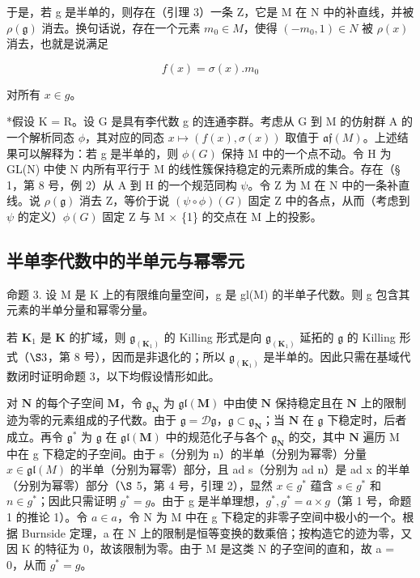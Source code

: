 于是，若 g 是半单的，则存在（引理 3）一条 Z，它是 M 在 N 中的补直线，并被 \(\rho(\mathfrak{g})\) 消去。换句话说，存在一个元素 \(m_{0} \in M\)，使得 \((-m_{0}, 1) \in N\) 被 \(\rho(x)\) 消去，也就是说满足

\[
f (x) = \sigma (x). m _ {0}\tag{2}
\]

对所有 \(x \in g\)。

*假设 K = R。设 G 是具有李代数 g 的连通李群。考虑从 G 到 M 的仿射群 A 的一个解析同态 \(\phi\)，其对应的同态 \(x \mapsto (f(x), \sigma(x))\) 取值于 \(\mathfrak{af}(M)\)。上述结果可以解释为：若 g 是半单的，则 \(\phi(G)\) 保持 M 中的一个点不动。令 H 为 GL(N) 中使 N 内所有平行于 M 的线性簇保持稳定的元素所成的集合。存在（§ 1，第 8 号，例 2）从 A 到 H 的一个规范同构 \(\psi\)。令 Z 为 M 在 N 中的一条补直线。说 \(\rho(\mathfrak{g})\) 消去 Z，等价于说 \((\psi \circ \phi)(G)\) 固定 Z 中的各点，从而（考虑到 \(\psi\) 的定义）\(\phi(G)\) 固定 Z 与 M × \{1\} 的交点在 M 上的投影。

\subsection{半单李代数中的半单元与幂零元}

命题 3. 设 M 是 K 上的有限维向量空间，g 是 gl(M) 的半单子代数。则 g 包含其元素的半单分量和幂零分量。

若 \(\mathbf{K}_1\) 是 \(\mathbf{K}\) 的扩域，则 \(\mathfrak{g}_{(\mathbf{K}_1)}\) 的 Killing 形式是向 \(\mathfrak{g}_{(\mathbf{K}_1)}\) 延拓的 \(\mathfrak{g}\) 的 Killing 形式（\(\S 3\)，第 8 号），因而是非退化的；所以 \(\mathfrak{g}_{(\mathbf{K}_1)}\) 是半单的。因此只需在基域代数闭时证明命题 3，以下均假设情形如此。

对 \(\mathbf{N}\) 的每个子空间 \(\mathbf{M}\)，令 \(\mathfrak{g}_{\mathbf{N}}\) 为 \(\mathfrak{gl}(\mathbf{M})\) 中由使 \(\mathbf{N}\) 保持稳定且在 \(\mathbf{N}\) 上的限制迹为零的元素组成的子代数。由于 \(\mathfrak{g} = \mathcal{D}\mathfrak{g}\)，\(\mathfrak{g} \subset \mathfrak{g}_{\mathbf{N}}\)；当 \(\mathbf{N}\) 在 \(\mathfrak{g}\) 下稳定时，后者成立。再令 \(\mathfrak{g}^*\) 为 \(\mathfrak{g}\) 在 \(\mathfrak{gl}(\mathbf{M})\) 中的规范化子与各个 \(\mathfrak{g}_{\mathbf{N}}\) 的交，其中 \(\mathbf{N}\) 遍历 M 中在 g 下稳定的子空间。由于 s（分别为 n）的半单（分别为幂零）分量 \(x \in \mathfrak{gl}(M)\) 的半单（分别为幂零）部分，且 ad s（分别为 ad n）是 ad x 的半单（分别为幂零）部分（\(\S\) 5，第 4 号，引理 2），显然 \(x \in g^{*}\) 蕴含 \(s \in g^{*}\) 和 \(n \in g^{*}\)；因此只需证明 \(g^{*} = g\)。由于 g 是半单理想，\(g^{*}, g^{*} = a \times g\)（第 1 号，命题 1 的推论 1）。令 \(a \in a\)，令 N 为 M 中在 g 下稳定的非零子空间中极小的一个。根据 Burnside 定理，a 在 N 上的限制是恒等变换的数乘倍；按构造它的迹为零，又因 K 的特征为 0，故该限制为零。由于 M 是这类 N 的子空间的直和，故 a = 0，从而 \(g^{*} = g\)。

